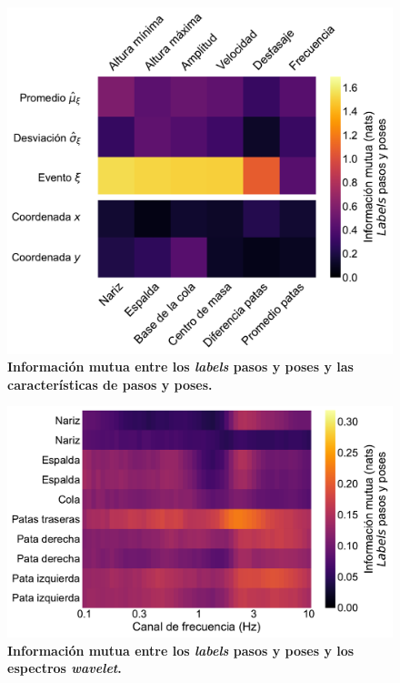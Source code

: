 \begin{appendix}
    \begin{figure}[htbp]
        \centering
        \includegraphics[width=0.7\linewidth]{figuras/capitulo4/mi_labels_scaler_stp.pdf}
        \caption{\textbf{Información mutua entre los \textit{labels} pasos y poses y las características de pasos y poses.}}
        \label{fig:capitulo4_mi_labels_scaler_stp}
    \end{figure}

    \begin{figure}[htbp]
        \centering
        \includegraphics[width=0.7\linewidth]{figuras/capitulo4/mi_contra_labels_wav.pdf}
        \caption{\textbf{Información mutua entre los \textit{labels} pasos y poses y los espectros \textit{wavelet}.}}
        \label{fig:capitulo4_mi_contra_labels_wav}
    \end{figure}


\end{appendix}
